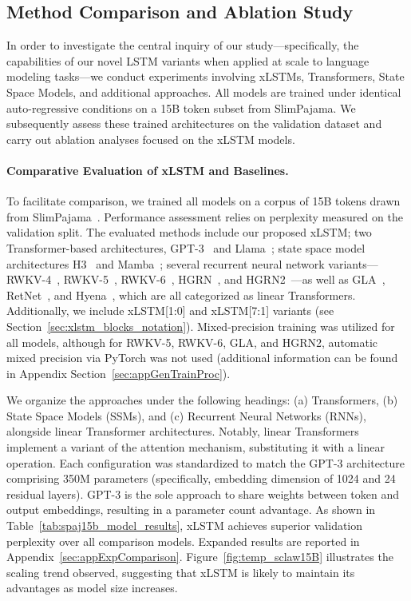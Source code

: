 \subsection{Method Comparison and Ablation Study}
\label{sec:ExpComparison}

In order to investigate the central inquiry of our study—specifically, the capabilities of our novel LSTM variants when applied at scale to language modeling tasks—we conduct experiments involving xLSTMs, Transformers, State Space Models, and additional approaches. All models are trained under identical auto-regressive conditions on a 15B token subset from SlimPajama. We subsequently assess these trained architectures on the validation dataset and carry out ablation analyses focused on the xLSTM models.

\paragraph{Comparative Evaluation of xLSTM and Baselines.} To facilitate comparison, we trained all models on a corpus of 15B tokens drawn from SlimPajama~\citep{Soboleva:23}. Performance assessment relies on perplexity measured on the validation split. The evaluated methods include our proposed xLSTM; two Transformer-based architectures, GPT-3~\citep{Brown:20short} and Llama~\citep{Touvron:23arxiv}; state space model architectures H3~\citep{Fu:23} and Mamba~\citep{Gu:24arxiv}; several recurrent neural network variants—RWKV-4~\citep{Peng:23arxivshort}, RWKV-5~\citep{Peng:24arxivshort}, RWKV-6~\citep{Peng:24arxivshort}, HGRN~\citep{Qin:23}, and HGRN2~\citep{Qin:24arxiv}—as well as GLA~\citep{Yang:23arxiv}, RetNet~\citep{Sun:23arxiv}, and Hyena~\citep{Poli:23}, which are all categorized as linear Transformers. Additionally, we include xLSTM[1:0] and xLSTM[7:1] variants (see Section~\ref{sec:xlstm_blocks_notation}). Mixed-precision training was utilized for all models, although for RWKV-5, RWKV-6, GLA, and HGRN2, automatic mixed precision via PyTorch was not used (additional information can be found in Appendix Section~\ref{sec:appGenTrainProc}). 

We organize the approaches under the following headings: (a) Transformers, (b) State Space Models (SSMs), and (c) Recurrent Neural Networks (RNNs), alongside linear Transformer architectures. Notably, linear Transformers implement a variant of the attention mechanism, substituting it with a linear operation. Each configuration was standardized to match the GPT-3 architecture comprising 350M parameters (specifically, embedding dimension of 1024 and 24 residual layers). GPT-3 is the sole approach to share weights between token and output embeddings, resulting in a parameter count advantage. As shown in Table~\ref{tab:spaj15b_model_results}, xLSTM achieves superior validation perplexity over all comparison models. Expanded results are reported in Appendix~\ref{sec:appExpComparison}. Figure~\ref{fig:temp_sclaw15B} illustrates the scaling trend observed, suggesting that xLSTM is likely to maintain its advantages as model size increases.

